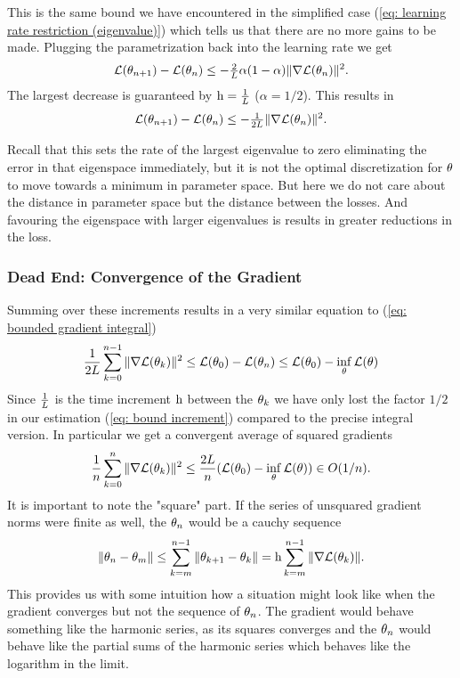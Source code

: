 %
This is the same bound we have encountered in the simplified case (\ref{eq:
learning rate restriction (eigenvalue)}) which tells us that there are no more
gains to be made. Plugging the parametrization back into the learning rate we
get
%
\begin{align*}
	\mathcal{L}(\theta_{n+1}) - \mathcal{L}(\theta_n)
	\le - \tfrac{2}{L}\alpha (1-\alpha)\|\nabla \mathcal{L}(\theta_n)\|^2.
\end{align*}
%
The largest decrease is guaranteed by \(\text{h}=\tfrac{1}{L}\) (\(\alpha=1/2\)).
This results in
%
\begin{align}\label{eq: optimal loss decrease step}
	\mathcal{L}(\theta_{n+1}) - \mathcal{L}(\theta_n)
	\le - \tfrac{1}{2L}\|\nabla \mathcal{L}(\theta_n)\|^2.
\end{align}
\begin{remark}
	Recall that this sets the rate of the largest eigenvalue to zero eliminating
	the error in that eigenspace immediately, but it is not the optimal
	discretization for \(\theta\) to move towards a minimum in parameter space.
	But here we do not care about the distance in parameter space but the
	distance between the losses. And favouring the eigenspace with larger
	eigenvalues is results in greater reductions in the loss.
\end{remark}
%
\subsubsection{Dead End: Convergence of the Gradient}

Summing over these increments results in a very similar equation to
(\ref{eq: bounded gradient integral})
%
\begin{align*}
	\frac{1}{2L} \sum_{k=0}^{n-1}\|\nabla \mathcal{L}(\theta_k)\|^2
	\le \mathcal{L}(\theta_0) - \mathcal{L}(\theta_n)
	\le \mathcal{L}(\theta_0) - \inf_{\theta} \mathcal{L}(\theta)
\end{align*}
%
Since \(\tfrac{1}{L}\) is the time increment \(\text{h}\) between the \(\theta_k\)
we have only lost the factor \(1/2\) in our estimation (\ref{eq: bound increment})
compared to the precise integral version.
In particular we get a convergent average of squared gradients
%
\begin{align*}
	\frac{1}{n} \sum_{k=0}^n \|\nabla \mathcal{L}(\theta_k)\|^2
	\le \frac{2 L}{n} (\mathcal{L}(\theta_0) - \inf_\theta \mathcal{L}(\theta)) \in O(1/n).
\end{align*}
%
It is important to note the "square" part. If the series of unsquared gradient
norms were finite as well, the \(\theta_n\) would be a cauchy sequence
%
\begin{align*}
	\|\theta_n - \theta_m \|
	\le \sum_{k=m}^{n-1} \|\theta_{k+1} - \theta_k\|
	= \text{h} \sum_{k=m}^{n-1} \|\nabla \mathcal{L}(\theta_k)\|.
\end{align*}
%
This provides us with some intuition how a situation might look like when the
gradient converges but not the sequence of \(\theta_n\). The gradient would
behave something like the harmonic series, as its squares converges and the
\(\theta_n\) would behave like the partial sums of the harmonic series which
behaves like the logarithm in the limit.


